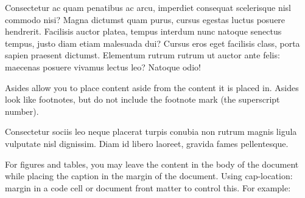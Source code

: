 \documentclass[
  brazilian,
  11pt,
  a4paper,
  open = right,
  twoside = true]{scrbook}
\newenvironment{Shaded}{\begin{snugshade}}{\end{snugshade}}
\newcommand{\AttributeTok}[1]{\textcolor[rgb]{0.00,0.28,0.67}{#1}}
\newcommand{\FunctionTok}[1]{\textcolor[rgb]{1.00,0.23,0.00}{#1}}
\newcommand{\NormalTok}[1]{\textcolor[rgb]{0.10,0.10,0.10}{#1}}
\newcommand{\OtherTok}[1]{\textcolor[rgb]{0.10,0.10,0.10}{#1}}
\newcommand{\SpecialCharTok}[1]{\textcolor[rgb]{0.85,0.00,0.31}{#1}}
\newcommand{\StringTok}[1]{\textcolor[rgb]{0.00,0.72,0.25}{#1}}
\begin{document}
Consectetur ac quam penatibus ac arcu, imperdiet consequat scelerisque
nisl commodo nisi? Magna dictumst quam purus, cursus egestas luctus
posuere hendrerit. Facilisis auctor platea, tempus interdum nunc natoque
senectus tempus, justo diam etiam malesuada dui? Cursus eros eget
facilisis class, porta sapien praesent dictumst. Elementum rutrum rutrum
ut auctor ante felis: maecenas posuere vivamus lectus leo? Natoque odio!

Asides allow you to place content aside from the content it is placed
in. Asides look like footnotes, but do not include the footnote mark
(the superscript number).

{}

Consectetur sociis leo neque placerat turpis conubia non rutrum magnis
ligula vulputate nisl dignissim. Diam id libero laoreet, gravida fames
pellentesque.

For figures and tables, you may leave the content in the body of the
document while placing the caption in the margin of the document. Using
cap-location: margin in a code cell or document front matter to control
this. For example:

\begin{Shaded}
\end{Shaded}
\end{document}

